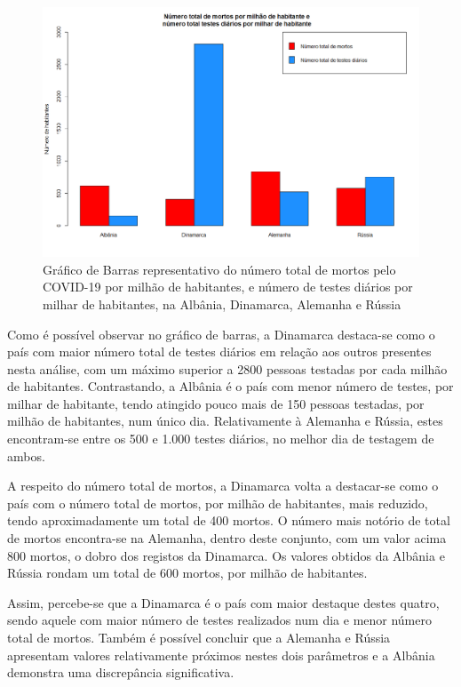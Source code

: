 \documentclass[conference]{IEEEtran}
\begin{document}
\begin{figure}[htbp]
\centerline{\includegraphics[width=0.95\columnwidth]{images/01.d.png}}
\caption{Gráfico de Barras representativo do número total de mortos pelo COVID-19 por milhão de habitantes, e número de testes diários por milhar de habitantes, na Albânia, Dinamarca, Alemanha e Rússia}
\label{fig}
\end{figure}

Como é possível observar no gráfico de barras, a Dinamarca destaca-se como o país com maior número total de testes diários em relação aos outros presentes nesta análise, com um máximo superior a 2800 pessoas testadas por cada milhão de habitantes. Contrastando, a Albânia é o país com menor número de testes, por milhar de habitante, tendo atingido pouco mais de 150 pessoas testadas, por milhão de habitantes, num único dia. Relativamente à Alemanha e Rússia, estes encontram-se entre os 500 e 1.000 testes diários, no melhor dia de testagem de ambos.

A respeito do número total de mortos, a Dinamarca volta a destacar-se como o país com o número total de mortos, por milhão de habitantes, mais reduzido, tendo aproximadamente um total de 400 mortos. O número mais notório de total de mortos encontra-se na Alemanha, dentro deste conjunto, com um valor acima 800 mortos, o dobro dos registos da Dinamarca. Os valores obtidos da Albânia e Rússia rondam um total de 600 mortos, por milhão de habitantes.

Assim, percebe-se que a Dinamarca é o país com maior destaque destes quatro, sendo aquele com maior número de testes realizados num dia e menor número total de mortos. Também é possível concluir que a Alemanha e Rússia apresentam valores relativamente próximos nestes dois parâmetros e a Albânia demonstra uma discrepância significativa.
\end{document}
